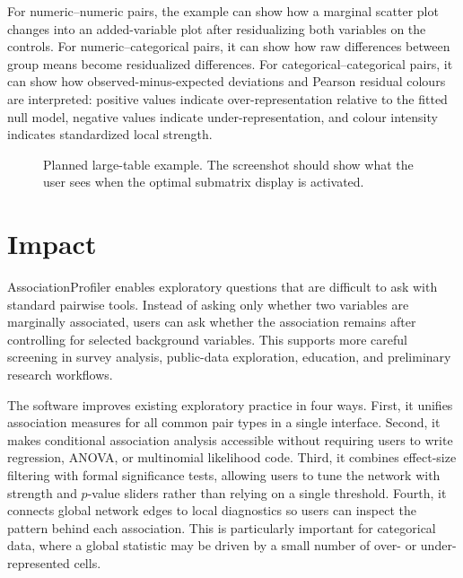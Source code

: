 \documentclass[preprint,12pt,a4paper]{elsarticle}
\begin{document}
For numeric--numeric pairs, the example can show how a marginal scatter plot changes into an added-variable plot after residualizing both variables on the controls. For numeric--categorical pairs, it can show how raw differences between group means become residualized differences. For categorical--categorical pairs, it can show how observed-minus-expected deviations and Pearson residual colours are interpreted: positive values indicate over-representation relative to the fitted null model, negative values indicate under-representation, and colour intensity indicates standardized local strength.

\begin{figure}[!ht]
\centering
{}
\caption{Planned large-table example. The screenshot should show what the user sees when the optimal submatrix display is activated.}
\label{fig:submatrix-example}
\end{figure}

\section{Impact}

AssociationProfiler enables exploratory questions that are difficult to ask with standard pairwise tools. Instead of asking only whether two variables are marginally associated, users can ask whether the association remains after controlling for selected background variables. This supports more careful screening in survey analysis, public-data exploration, education, and preliminary research workflows.

The software improves existing exploratory practice in four ways. First, it unifies association measures for all common pair types in a single interface. Second, it makes conditional association analysis accessible without requiring users to write regression, ANOVA, or multinomial likelihood code. Third, it combines effect-size filtering with formal significance tests, allowing users to tune the network with strength and $p$-value sliders rather than relying on a single threshold. Fourth, it connects global network edges to local diagnostics so users can inspect the pattern behind each association. This is particularly important for categorical data, where a global statistic may be driven by a small number of over- or under-represented cells.
\end{document}
